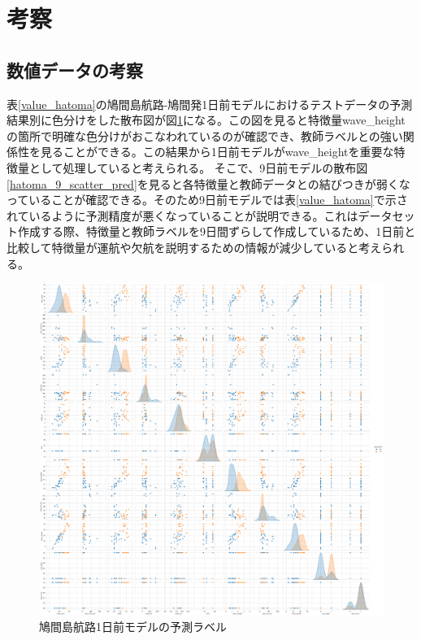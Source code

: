 \section{考察}

\subsection{数値データの考察}

表\ref{value_hatoma}の鳩間島航路-鳩間発1日前モデルにおけるテストデータの予測結果別に色分けをした散布図が図\ref{hatoma_1_scatter_pred}になる。この図を見ると特徴量wave\_heightの箇所で明確な色分けがおこなわれているのが確認でき、教師ラベルとの強い関係性を見ることができる。この結果から1日前モデルがwave\_heightを重要な特徴量として処理していると考えられる。
そこで、9日前モデルの散布図\ref{hatoma_9_scatter_pred}を見ると各特徴量と教師データとの結びつきが弱くなっていることが確認できる。そのため9日前モデルでは表\ref{value_hatoma}で示されているように予測精度が悪くなっていることが説明できる。これはデータセット作成する際、特徴量と教師ラベルを9日間ずらして作成しているため、1日前と比較して特徴量が運航や欠航を説明するための情報が減少していると考えられる。

\begin{figure}[H]
 \centering
 \includegraphics[keepaspectratio, scale=0.25]{fig/chapter4/hatoma_1_pred.png}
 \caption{鳩間島航路1日前モデルの予測ラベル}
 \label{hatoma_1_scatter_pred}
\end{figure}

